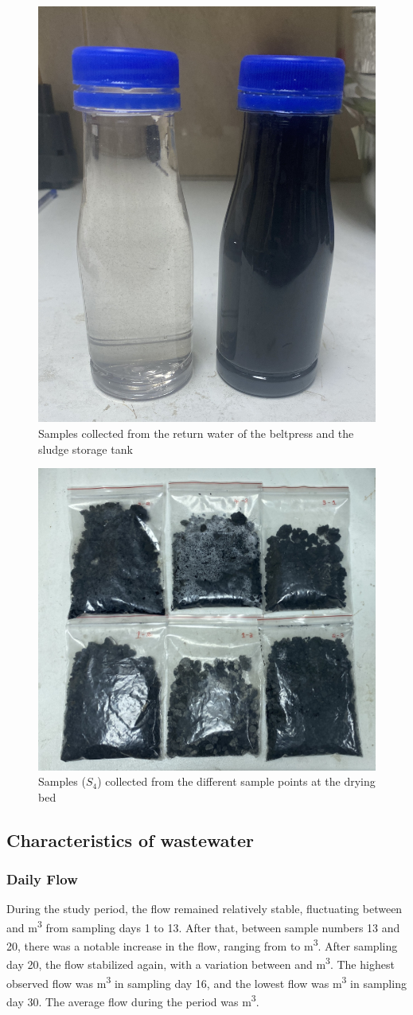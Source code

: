 

\begin{figure}[H]
\centering
\includegraphics[width=0.4\linewidth]{results/Sample storage tank and return water.jpg}
\caption{Samples collected from the return water of the beltpress and the sludge storage tank}
\label{fig:Sample_storagetank_returnwater}
\end{figure}

\begin{figure}[H]
\centering
\includegraphics[width=0.6\linewidth]{results/Sample drying bed.jpg}
\caption{Samples ($S_4$) collected from the different sample points at the drying bed}
\label{fig:Sample_dryingbed}
\end{figure}


\newpage
\subsection{Characteristics of wastewater}

\subsubsection{Daily Flow}
During the study period, the flow remained relatively stable, fluctuating between  and  \unit{m^3} from sampling days 1 to 13. After that, between sample numbers 13 and 20, there was a notable increase in the flow, ranging from  to  \unit{m^3}. After sampling day 20, the flow stabilized again, with a variation between  and  \unit{m^3}. The highest observed flow was  \unit{m^3} in sampling day 16, and the lowest flow was  \unit{m^3} in sampling day 30. The average flow during the period was  \unit{m^3}. 

